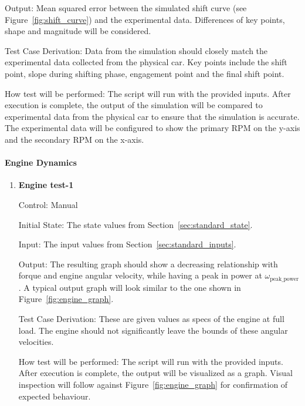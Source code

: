 \documentclass[12pt, titlepage]{article}
\begin{document}
\begin{enumerate}
  Output: Mean squared error between the simulated shift curve (see Figure~\ref{fig:shift_curve}) and the experimental data. Differences of key points, shape and magnitude will be considered.

  Test Case Derivation: Data from the simulation should closely match the experimental data collected from the physical car. Key points include the shift point, slope during shifting phase, engagement point and the final shift point.

  How test will be performed: The script will run with the provided inputs. After execution is complete, the output of the simulation will be compared to experimental data from the physical car to ensure that the simulation is accurate. The experimental data will be configured to show the primary RPM on the y-axis and the secondary RPM on the x-axis.

\end{enumerate}

\paragraph{Engine Dynamics}

\begin{enumerate}

  \item {} \hypertarget{Engine test-1}{\textbf{Engine test-1}} \label{Engine test-1}
  
  Control: Manual
            
  Initial State: The state values from Section~\ref{sec:standard_state}.
  
  Input: The input values from Section~\ref{sec:standard_inputs}.
            
  Output: The resulting graph should show a decreasing relationship with forque and engine angular velocity, while having a peak in power at $\omega_\text{peak\_power}$. A typical output graph will look similar to the one shown in Figure~\ref{fig:engine_graph}.
  
  Test Case Derivation: These are given values as specs of the engine at full load. The engine should not significantly leave the bounds of these angular velocities.
  
  How test will be performed: The script will run with the provided inputs. After execution is complete, the output will be visualized as a graph. Visual inspection will follow against Figure~\ref{fig:engine_graph} for confirmation of expected behaviour.

\end{enumerate}
\end{document}
